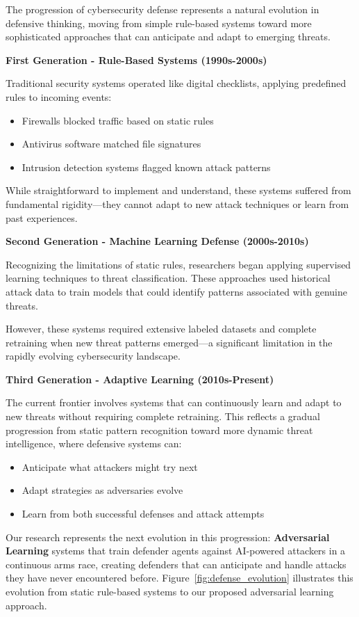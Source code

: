 \documentclass[12pt]{article}
\theoremstyle{definition}
\theoremstyle{plain}
\begin{document}
The progression of cybersecurity defense represents a natural evolution in defensive thinking, moving from simple rule-based systems toward more sophisticated approaches that can anticipate and adapt to emerging threats.

\textbf{First Generation - Rule-Based Systems (1990s-2000s)}

Traditional security systems operated like digital checklists, applying predefined rules to incoming events:
\begin{itemize}
    \item Firewalls blocked traffic based on static rules
    \item Antivirus software matched file signatures
    \item Intrusion detection systems flagged known attack patterns
\end{itemize}

While straightforward to implement and understand, these systems suffered from fundamental rigidity—they cannot adapt to new attack techniques or learn from past experiences.

\textbf{Second Generation - Machine Learning Defense (2000s-2010s)}

Recognizing the limitations of static rules, researchers began applying supervised learning techniques to threat classification. These approaches used historical attack data to train models that could identify patterns associated with genuine threats. 

However, these systems required extensive labeled datasets and complete retraining when new threat patterns emerged—a significant limitation in the rapidly evolving cybersecurity landscape.

\textbf{Third Generation - Adaptive Learning (2010s-Present)}

The current frontier involves systems that can continuously learn and adapt to new threats without requiring complete retraining. This reflects a gradual progression from static pattern recognition toward more dynamic threat intelligence, where defensive systems can:
\begin{itemize}
    \item Anticipate what attackers might try next
    \item Adapt strategies as adversaries evolve
    \item Learn from both successful defenses and attack attempts
\end{itemize}

Our research represents the next evolution in this progression: \textbf{Adversarial Learning} systems that train defender agents against AI-powered attackers in a continuous arms race, creating defenders that can anticipate and handle attacks they have never encountered before. Figure~\ref{fig:defense_evolution} illustrates this evolution from static rule-based systems to our proposed adversarial learning approach.
\end{document}

